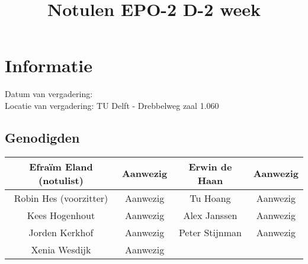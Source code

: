 \documentclass{article}
\begin{document}
\title{Notulen EPO-2 D-2 week }%
\author{}%
\maketitle

\section*{Informatie}
Datum van vergadering: \\ %
Locatie van vergadering: TU Delft - Drebbelweg zaal 1.060 %
\subsection*{Genodigden}
\begin{center}
\begin{tabular}{|c |c | c| c|}
	\hline
Efraïm Eland (notulist) & Aanwezig & Erwin de Haan & Aanwezig \\
	\hline
Robin Hes (voorzitter) & Aanwezig & Tu Hoang & Aanwezig \\
	\hline
Kees Hogenhout & Aanwezig & Alex Janssen & Aanwezig\\
	\hline
Jorden Kerkhof & Aanwezig & Peter Stijnman & Aanwezig \\
	\hline
Xenia Wesdijk & Aanwezig & & \\
	\hline
\end{tabular}
\end{center}
\end{document}
